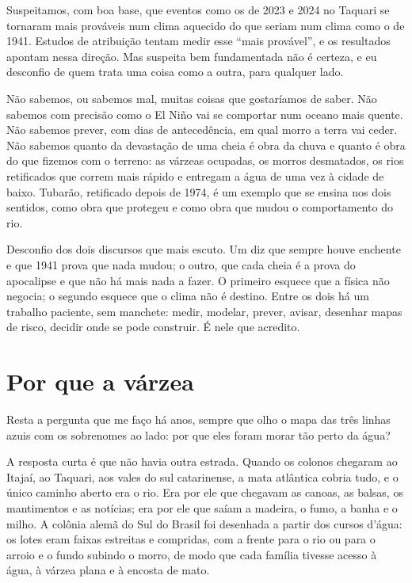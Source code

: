 \documentclass[
  brazilian,
  11pt,
  openany]{book}
\begin{document}
Suspeitamos, com boa base, que eventos como os de 2023 e 2024 no Taquari
se tornaram mais prováveis num clima aquecido do que seriam num clima
como o de 1941. Estudos de atribuição tentam medir esse ``mais
provável'', e os resultados apontam nessa direção. Mas suspeita bem
fundamentada não é certeza, e eu desconfio de quem trata uma coisa como
a outra, para qualquer lado.

Não sabemos, ou sabemos mal, muitas coisas que gostaríamos de saber. Não
sabemos com precisão como o El Niño vai se comportar num oceano mais
quente. Não sabemos prever, com dias de antecedência, em qual morro a
terra vai ceder. Não sabemos quanto da devastação de uma cheia é obra da
chuva e quanto é obra do que fizemos com o terreno: as várzeas ocupadas,
os morros desmatados, os rios retificados que correm mais rápido e
entregam a água de uma vez à cidade de baixo. Tubarão, retificado depois
de 1974, é um exemplo que se ensina nos dois sentidos, como obra que
protegeu e como obra que mudou o comportamento do rio.

Desconfio dos dois discursos que mais escuto. Um diz que sempre houve
enchente e que 1941 prova que nada mudou; o outro, que cada cheia é a
prova do apocalipse e que não há mais nada a fazer. O primeiro esquece
que a física não negocia; o segundo esquece que o clima não é destino.
Entre os dois há um trabalho paciente, sem manchete: medir, modelar,
prever, avisar, desenhar mapas de risco, decidir onde se pode construir.
É nele que acredito.

\section{Por que a várzea}\label{por-que-a-vuxe1rzea}

Resta a pergunta que me faço há anos, sempre que olho o mapa das três
linhas azuis com os sobrenomes ao lado: por que eles foram morar tão
perto da água?

A resposta curta é que não havia outra estrada. Quando os colonos
chegaram ao Itajaí, ao Taquari, aos vales do sul catarinense, a mata
atlântica cobria tudo, e o único caminho aberto era o rio. Era por ele
que chegavam as canoas, as balsas, os mantimentos e as notícias; era por
ele que saíam a madeira, o fumo, a banha e o milho. A colônia alemã do
Sul do Brasil foi desenhada a partir dos cursos d'água: os lotes eram
faixas estreitas e compridas, com a frente para o rio ou para o arroio e
o fundo subindo o morro, de modo que cada família tivesse acesso à água,
à várzea plana e à encosta de mato.
\end{document}
